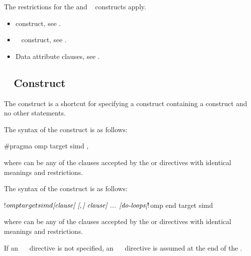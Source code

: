 \restrictions
The restrictions for the  and ~ constructs 
apply.

\crossreferences
\begin{itemize}
\item {} construct, see .

\item {}~ construct, see
.

\item Data attribute clauses, see .
\end{itemize}



\subsection{~ Construct}
\label{subsec:target simd Construct}

\summary
The   construct is a shortcut for specifying a 
construct containing a  construct and no other statements.

\syntax
\begin{ccppspecific}
The syntax of the   construct is as follows:

\begin{ompcPragma}
#pragma omp target simd \plc{[clause[ [},\plc{] clause] ... ] new-line}
\end{ompcPragma}

where  can be any of the clauses accepted by the  or
 directives with identical meanings and restrictions.

\end{ccppspecific}

\begin{fortranspecific}
The syntax of the   construct is as follows:

\begin{ompfPragma}
!$omp target simd \plc{[clause[ [},\plc{] clause] ... ]}
    \plc{do-loops}
\plc{[}!$omp end target simd\plc{]}
\end{ompfPragma}

where  can be any of the clauses accepted by the  or
 directives with identical meanings and restrictions.

If an ~~ directive is not specified, an
~~ directive is assumed at the end of
the .
\end{fortranspecific}

